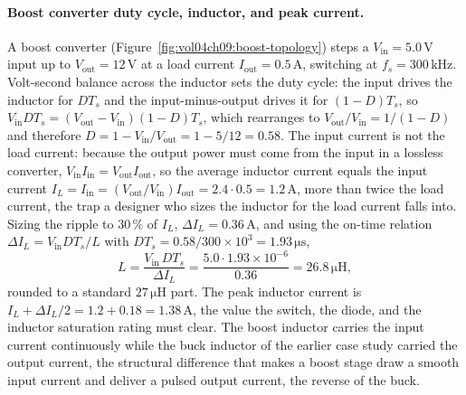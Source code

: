 \paragraph{Boost converter duty cycle, inductor, and peak current.}
A boost converter (Figure~\ref{fig:vol04ch09:boost-topology}) steps a
$V_{\text{in}} = 5.0\,\si{\volt}$ input up to $V_{\text{out}} = 12\,\si{\volt}$
at a load current $I_{\text{out}} = 0.5\,\si{\ampere}$, switching at $f_s =
300\,\si{\kilo\hertz}$. Volt-second balance across the inductor sets the duty
cycle: the input drives the inductor for $DT_s$ and the input-minus-output
drives it for $(1-D)T_s$, so $V_{\text{in}}DT_s = (V_{\text{out}}-V_{\text{in}})
(1-D)T_s$, which rearranges to $V_{\text{out}}/V_{\text{in}} = 1/(1-D)$ and
therefore $D = 1 - V_{\text{in}}/V_{\text{out}} = 1 - 5/12 = 0.58$. The input
current is not the load current: because the output power must come from the
input in a lossless converter, $V_{\text{in}}I_{\text{in}} = V_{\text{out}}
I_{\text{out}}$, so the average inductor current equals the input current
$I_L = I_{\text{in}} = (V_{\text{out}}/V_{\text{in}})I_{\text{out}} = 2.4\cdot
0.5 = 1.2\,\si{\ampere}$, more than twice the load current, the trap a designer
who sizes the inductor for the load current falls into. Sizing the ripple to
$30\,\%$ of $I_L$, $\Delta I_L = 0.36\,\si{\ampere}$, and using the on-time
relation $\Delta I_L = V_{\text{in}}DT_s/L$ with $DT_s = 0.58/300\times 10^{3} =
1.93\,\si{\micro\second}$,
\[
L = \frac{V_{\text{in}}\,DT_s}{\Delta I_L}
= \frac{5.0\cdot 1.93\times 10^{-6}}{0.36}
= 26.8\,\si{\micro\henry},
\]
rounded to a standard $27\,\si{\micro\henry}$ part. The peak inductor current
is $I_L + \Delta I_L/2 = 1.2 + 0.18 = 1.38\,\si{\ampere}$, the value the
switch, the diode, and the inductor saturation rating must clear. The boost
inductor carries the input current continuously while the buck inductor of the
earlier case study carried the output current, the structural difference that
makes a boost stage draw a smooth input current and deliver a pulsed output
current, the reverse of the buck.

